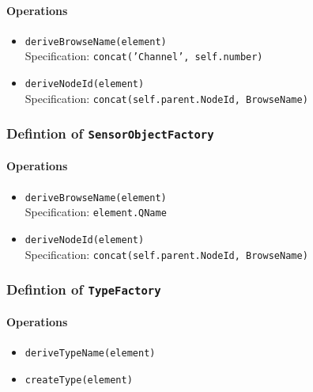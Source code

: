 \paragraph{Operations}
\begin{itemize}
  \item \texttt{deriveBrowseName(element)}\\
    Specification: \texttt{concat('Channel', self.number)}

  \item \texttt{deriveNodeId(element)}\\
    Specification: \texttt{concat(self.parent.NodeId, BrowseName)}

\end{itemize}
\subsubsection{Defintion of \texttt{SensorObjectFactory}} \label{type:SensorObjectFactory}

\FloatBarrier



\paragraph{Operations}
\begin{itemize}
  \item \texttt{deriveBrowseName(element)}\\
    Specification: \texttt{element.QName}

  \item \texttt{deriveNodeId(element)}\\
    Specification: \texttt{concat(self.parent.NodeId, BrowseName)}

\end{itemize}
\subsubsection{Defintion of \texttt{TypeFactory}} \label{type:TypeFactory}

\FloatBarrier



\paragraph{Operations}
\begin{itemize}
  \item \texttt{deriveTypeName(element)}
  \item \texttt{createType(element)}
\end{itemize}
